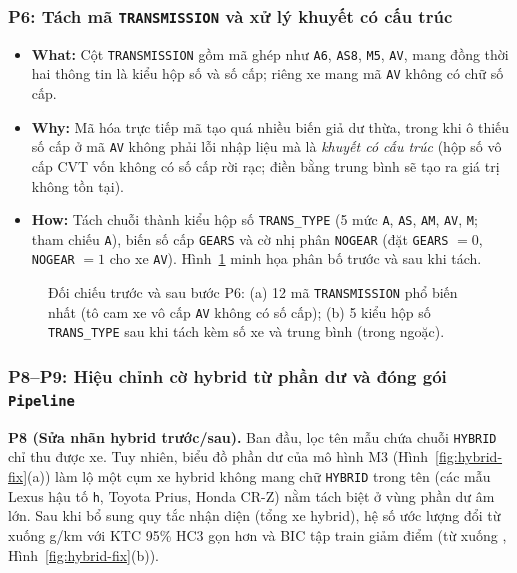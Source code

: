 \subsubsection{P6: Tách \nTransCodes{} mã \texttt{TRANSMISSION} và xử lý khuyết có cấu trúc}
\begin{itemize}
  \item \textbf{What:} Cột \texttt{TRANSMISSION} gồm \nTransCodes{} mã ghép như \texttt{A6}, \texttt{AS8}, \texttt{M5}, \texttt{AV}, mang đồng thời hai thông tin là kiểu hộp số và số cấp; riêng \nNoGear{} xe mang mã \texttt{AV} không có chữ số cấp.
  \item \textbf{Why:} Mã hóa trực tiếp \nTransCodes{} mã tạo quá nhiều biến giả dư thừa, trong khi ô thiếu số cấp ở mã \texttt{AV} không phải lỗi nhập liệu mà là \emph{khuyết có cấu trúc} (hộp số vô cấp CVT vốn không có số cấp rời rạc; điền bằng trung bình sẽ tạo ra giá trị không tồn tại).
  \item \textbf{How:} Tách chuỗi thành kiểu hộp số \texttt{TRANS\_TYPE} (5 mức \texttt{A}, \texttt{AS}, \texttt{AM}, \texttt{AV}, \texttt{M}; tham chiếu \texttt{A}), biến số cấp \texttt{GEARS} và cờ nhị phân \texttt{NOGEAR} (đặt \texttt{GEARS} $= 0$, \texttt{NOGEAR} $= 1$ cho \nNoGear{} xe \texttt{AV}). Hình~\ref{fig:trans-split} minh họa phân bố trước và sau khi tách.
\end{itemize}

\begin{figure}[htbp]
  \centering
  
  \caption{Đối chiếu trước và sau bước P6: (a) 12 mã \texttt{TRANSMISSION} phổ biến nhất (tô cam \nNoGear{} xe vô cấp \texttt{AV} không có số cấp); (b) 5 kiểu hộp số \texttt{TRANS\_TYPE} sau khi tách kèm số xe và \COtwo{} trung bình (trong ngoặc).}
  \label{fig:trans-split}
\end{figure}

\subsubsection{P8--P9: Hiệu chỉnh cờ hybrid từ phần dư và đóng gói \texttt{Pipeline}}
\textbf{P8 (Sửa nhãn hybrid trước/sau).} Ban đầu, lọc tên mẫu chứa chuỗi \texttt{HYBRID} chỉ thu được \nHybridOld{} xe. Tuy nhiên, biểu đồ phần dư của mô hình M3 (Hình~\ref{fig:hybrid-fix}(a)) làm lộ một cụm \nHybridMissed{} xe hybrid không mang chữ \texttt{HYBRID} trong tên (các mẫu Lexus hậu tố \texttt{h}, Toyota Prius, Honda CR-Z) nằm tách biệt ở vùng phần dư âm lớn. Sau khi bổ sung quy tắc nhận diện (tổng \nHybrid{} xe hybrid), hệ số ước lượng đổi từ \bHybridOld{} xuống \bHybrid{} g/km với KTC 95\% HC3 gọn hơn và BIC tập train giảm \bicDropFlag{} điểm (từ \bicThreeHOld{} xuống \bicThreeH{}, Hình~\ref{fig:hybrid-fix}(b)).

